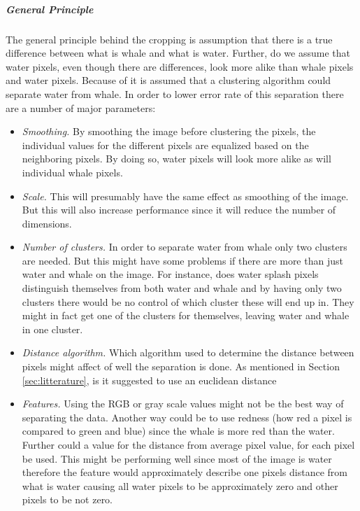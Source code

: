 \subparagraph{General Principle}
The general principle behind the cropping is  assumption that there is a true difference between what is whale and what is water. Further, do we assume that water pixels, even though there are differences, look more alike than whale pixels and water pixels.
Because of it is assumed that a clustering algorithm could separate water from whale.
In order to lower error rate of this separation there are a number of major parameters:
\begin{itemize}
\item \textit{Smoothing.} By smoothing the image before clustering the pixels, the individual values for the different pixels are equalized based on the neighboring pixels. By doing so, water pixels will look more alike as will individual whale pixels.
\item \textit{Scale.} This will presumably have the same effect as smoothing of the image. But this will also increase performance since it will reduce the number of dimensions.  
\item \textit{Number of clusters.} In order to separate water from whale only two clusters are needed. But this might have some problems if there are more than just water and whale on the image. For instance, does water splash pixels distinguish themselves from both water and whale and by having  only two clusters there would be no control of which cluster these will end up in. They might in fact get one of the clusters for themselves, leaving water and whale in one cluster.
\item \textit{Distance algorithm.} Which algorithm used to determine the distance between pixels might affect of well the separation is done. As mentioned in Section \ref{sec:litterature}, is it suggested to use an euclidean distance
\item \textit{Features.} Using the RGB or gray scale values might not be the best way of separating the data. Another way could be to use redness (how red a pixel is compared to green and blue) since the whale is more red than the water. Further could a value for the distance from average pixel value, for each pixel be used. This might be performing well since most of the image is water therefore the feature would approximately describe one pixels distance from what is water causing all water pixels to be approximately zero and other pixels to be not zero.
\end{itemize}
